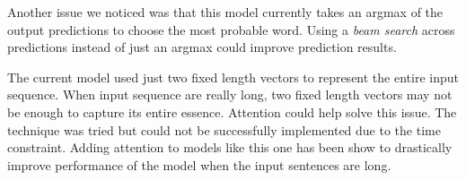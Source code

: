 Another issue we noticed was that this model currently takes an argmax of the output predictions to choose the most probable word. 
Using a \emph{beam search} across predictions instead of just an argmax could improve prediction results.
    
The current model used just two fixed length vectors to represent the entire input sequence. 
When input sequence are really long, two fixed length vectors may not be enough to capture its entire essence. 
Attention could help solve this issue. 
The technique was tried but could not be successfully implemented due to the time constraint. 
Adding attention to models like this one has been show to drastically improve performance of the model when the input sentences are long.